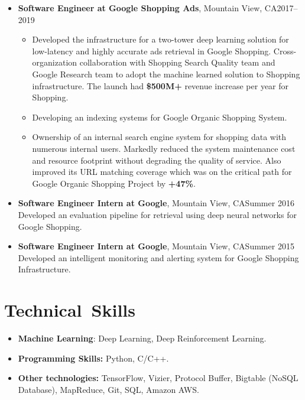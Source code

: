 \documentclass[overlapped]{res}
\begin{document}
\begin{resume}
\begin{itemize}
\begin{itemize}
\end{itemize}
\item {\bf Software Engineer at Google Shopping Ads}, Mountain View, CA\hfill 2017--2019
\begin{itemize}
\item{Developed the infrastructure for a two-tower deep learning solution for low-latency and highly accurate ads retrieval in Google Shopping. Cross-organization collaboration with Shopping Search Quality team and Google Research team to adopt the machine learned solution to Shopping infrastructure. The launch had {\bf \$500M+} revenue increase per year for Shopping.}
\item{Developing an indexing systems for Google Organic Shopping System.}
\item{Ownership of an internal search engine system for shopping data with numerous internal users. Markedly reduced the system maintenance cost and resource footprint without degrading the quality of service. Also improved its URL matching coverage which was on the critical path for Google Organic Shopping Project by {\bf +47\%}.}
\end{itemize}
\item {\bf Software Engineer Intern at Google}, Mountain View, CA\hfill Summer 2016\\
Developed an evaluation pipeline for retrieval using deep neural networks  for Google Shopping.
\item {\bf Software Engineer Intern at Google}, Mountain View, CA\hfill Summer 2015\\
Developed an intelligent monitoring and alerting system for Google Shopping Infrastructure.
\end{itemize}

\section{Technical\ Skills}
\begin{itemize}
\item {\bf Machine Learning}: Deep Learning, Deep Reinforcement Learning.
\item {\bf Programming Skills:} Python, C/C++.
\item {\bf Other technologies:}
TensorFlow, Vizier, Protocol Buffer, Bigtable (NoSQL Database), MapReduce, Git, SQL, Amazon AWS.
\end{itemize}


\end{resume}
\end{document}

